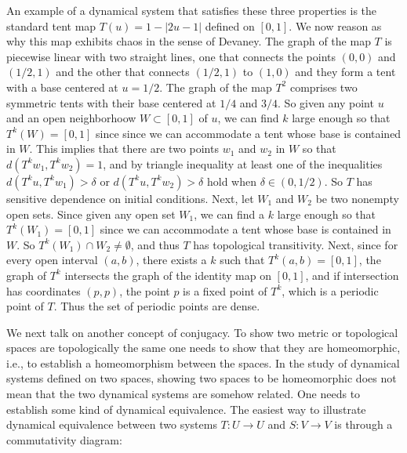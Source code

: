 \documentclass[12 pt]{article}
\begin{document}
An example of a dynamical system that satisfies these three properties is the standard tent map $T(u)=1-|2u-1|$ defined on $[0,1]$. We now reason as why this map exhibits chaos in the sense of Devaney.   The graph of the map $T$ is piecewise linear with two straight lines, one that connects the points $(0,0)$ and $(1/2,1)$ and the other that connects $(1/2,1)$ to $(1,0)$ and they form a tent with a base centered at $u=1/2$. The graph of the map $T^2$ comprises two symmetric tents with their base centered at $1/4$ and $3/4$.  So given any point $u$ and an open neighborhoow $W  \subset [0,1]$ of $u$, we can find $k$ large enough so that $T^k(W) = [0,1]$ since since we can accommodate a tent whose base is contained in $W$. This implies that there are two points $w_1$ and $w_2$ in $W$ so that $d(T^kw_1,T^kw_2)= 1$, and by triangle inequality  at least one of the inequalities $d(T^ku,T^kw_1)> \delta$ or $d(T^ku,T^kw_2)> \delta$ hold when $\delta\in (0,1/2)$.  So $T$ has sensitive dependence on initial conditions.  Next, let $W_1$ and $W_2$ be two nonempty open sets. Since given any open set $W_1$, we can find a $k$ large enough so that $T^k(W_1) = [0,1]$ since we can accommodate a tent whose base is contained in $W$. So $T^k(W_1) \cap W_2 \not=\emptyset$, and thus $T$ has topological transitivity. Next, since for every open interval $(a,b)$,  there exists a $k$ such that $T^k(a,b) = [0,1]$, the graph of $T^k$ intersects the graph of the identity map on $[0,1]$, and if intersection has coordinates $(p,p)$,  the point $p$ is a fixed point of $T^k$, which is a periodic point of $T$. Thus the set of periodic points are dense. 

We next talk on another concept of conjugacy. 
To show two metric or topological spaces are topologically the same one needs to show that they are homeomorphic, i.e., to establish a homeomorphism between the spaces. In the study of dynamical systems defined on two spaces, showing two spaces to be homeomorphic does not mean that the two dynamical systems are somehow related. One needs to establish some kind of dynamical equivalence. The easiest way to illustrate dynamical equivalence between two systems $T:U\to U$ and $S:V\to V$  is through a commutativity diagram: 
\end{document}
